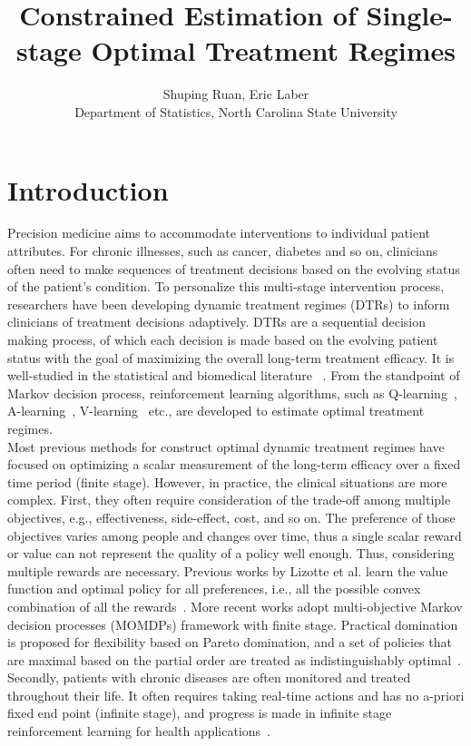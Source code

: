 \documentclass{article}
\title{Constrained Estimation of Single-stage Optimal Treatment Regimes}
\author{Shuping Ruan, Eric Laber\\ Department of Statistics, North Carolina State University}
\begin{document}
\maketitle

\section{Introduction}
Precision medicine aims to accommodate interventions to individual patient attributes. For chronic illnesses, such as cancer, diabetes and so on, clinicians often need to make sequences of treatment decisions based on the evolving status of the patient's condition. To personalize this multi-stage intervention process, researchers have been developing dynamic treatment regimes (DTRs) to inform clinicians of treatment decisions adaptively. DTRs are a sequential decision making process, of which each decision is made based on the evolving patient status with the goal of maximizing the overall long-term treatment efficacy. It is well-studied in the statistical and biomedical literature ~\cite{Murphy2003, Moodie2004,Murphy2005,Zhang2012, Laber2014,Linn2014}. From the standpoint of Markov decision process, reinforcement learning algorithms, such as Q-learning~\cite{Murphy2005}, A-learning~\cite{blatt2004learning}, V-learning~\cite{Luckett2016} etc., are developed to estimate optimal treatment regimes. \\

Most previous methods for construct optimal dynamic treatment regimes have focused on optimizing a scalar measurement of the long-term efficacy over a fixed time period (finite stage).  However, in practice, the clinical situations are more complex. First, they often require consideration of the trade-off among multiple objectives, e.g., effectiveness, side-effect, cost, and so on. The preference of those objectives varies among people and changes over time, thus a single scalar reward or value can not represent the quality of a policy well enough. Thus, considering multiple rewards are necessary. Previous works by Lizotte et al. learn the value function and optimal policy for all preferences, i.e., all the possible convex combination of all the rewards~\cite{Lizotte2010,Lizotte2012}. More recent works adopt multi-objective Markov decision processes (MOMDPs) framework with finite stage. Practical domination is proposed for flexibility based on Pareto domination, and a set of policies that are maximal based on the partial order are treated as indistinguishably optimal~\cite{LaberTwo2014, Lizotte2016}. Secondly, patients with chronic diseases are often monitored and treated throughout their life. It often requires taking real-time actions and has no a-priori fixed end point (infinite stage), and progress is made in infinite stage reinforcement learning for health applications~\cite{Ertefaie2014,Murphy2016,Luckett2016}.\\
\end{document}

